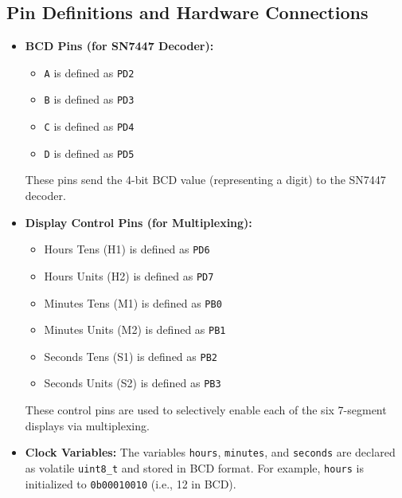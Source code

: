 \documentclass{article}
\theoremstyle{remark}
\begin{document}
\subsection{Pin Definitions and Hardware Connections}
\begin{itemize}[noitemsep]
    \item \textbf{BCD Pins (for SN7447 Decoder):}  
    \begin{itemize}[noitemsep]
        \item \texttt{A} is defined as \texttt{PD2}
        \item \texttt{B} is defined as \texttt{PD3}
        \item \texttt{C} is defined as \texttt{PD4}
        \item \texttt{D} is defined as \texttt{PD5}
    \end{itemize}
    These pins send the 4-bit BCD value (representing a digit) to the SN7447 decoder.
    
    \item \textbf{Display Control Pins (for Multiplexing):}
    \begin{itemize}[noitemsep]
        \item Hours Tens (H1) is defined as \texttt{PD6}
        \item Hours Units (H2) is defined as \texttt{PD7}
        \item Minutes Tens (M1) is defined as \texttt{PB0}
        \item Minutes Units (M2) is defined as \texttt{PB1}
        \item Seconds Tens (S1) is defined as \texttt{PB2}
        \item Seconds Units (S2) is defined as \texttt{PB3}
    \end{itemize}
    These control pins are used to selectively enable each of the six 7-segment displays via multiplexing.

    \item \textbf{Clock Variables:}  
    The variables \texttt{hours}, \texttt{minutes}, and \texttt{seconds} are declared as volatile \texttt{uint8\_t} and stored in BCD format. For example, \texttt{hours} is initialized to \texttt{0b00010010} (i.e., 12 in BCD).
\end{itemize}
\end{document}
